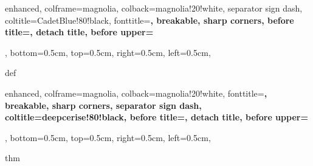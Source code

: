 
%
{
  enhanced,
  colframe=magnolia,
  colback=magnolia!20!white,
  separator sign dash,
  coltitle=CadetBlue!80!black,
  fonttitle=\ttfamily\bfseries,
  breakable,
  sharp corners,
  before title={\textcolor{CadetBlue!80!black}{\faGraduationCap}\hspace{1ex}},
  detach title,
  before upper={\tcbtitle\par},
  bottom=0.5cm,
  top=0.5cm,
  right=0.5cm,
  left=0.5cm,
}{def}

%
{
  enhanced,
  colframe=magnolia,
  colback=magnolia!20!white,
  fonttitle=\ttfamily\bfseries,
  breakable,
  sharp corners,
  separator sign dash,
  coltitle=deepcerise!80!black,
  before title={\textcolor{deepcerise!80!black}{\faAnchor}\hspace{1ex}},
  detach title,
  before upper={\tcbtitle\par},
  bottom=0.5cm,
  top=0.5cm,
  right=0.5cm,
  left=0.5cm,
}{thm}
